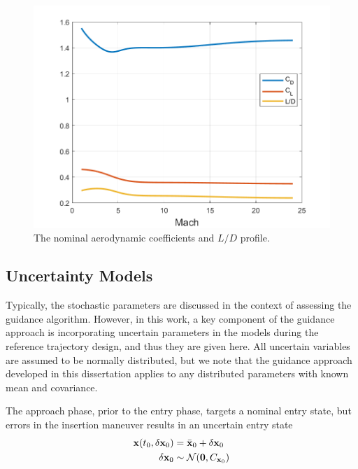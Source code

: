 \begin{figure}[h!]
	\centering
	\includegraphics[width=1\textwidth]{Images/CoeffNominal}
	\caption{The nominal aerodynamic coefficients and $L/D$ profile.}
	\label{Fig:AeroCoeffNominal}
\end{figure}

\subsection{Uncertainty Models}
Typically, the stochastic parameters are discussed in the context of assessing the guidance algorithm. However, in this work, a key component of the guidance approach is incorporating uncertain parameters in the models during the reference trajectory design, and thus they are given here. All uncertain variables are assumed to be normally distributed, but we note that the guidance approach developed in this dissertation applies to any distributed parameters with known mean and covariance. 

The approach phase, prior to the entry phase, targets a nominal entry state, but errors in the insertion maneuver results in an uncertain entry state
\begin{align}
	\mathbf{x}(t_0, \delta\mathbf{x}_0) &= \bar{\mathbf{x}}_0 + \delta\mathbf{x}_0 \\
	\delta\mathbf{x}_0 &\sim \mathcal{N}(\mathbf{0}, C_{\mathbf{x}_0}) \nonumber
\end{align}

